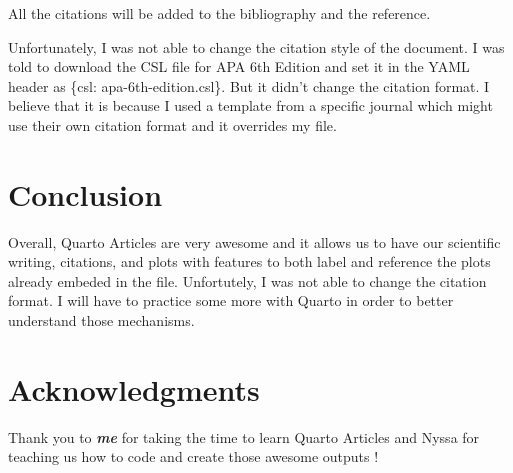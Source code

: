 \documentclass[
  10pt,
  letterpaper,
]{article}
\begin{document}
All the citations will be added to the bibliography and the reference.

Unfortunately, I was not able to change the citation style of the
document. I was told to download the CSL file for APA 6th Edition and
set it in the YAML header as \{csl: apa-6th-edition.csl\}. But it didn't
change the citation format. I believe that it is because I used a
template from a specific journal which might use their own citation
format and it overrides my file.

\section{Conclusion}\label{conclusion}

Overall, Quarto Articles are very awesome and it allows us to have our
scientific writing, citations, and plots with features to both label and
reference the plots already embeded in the file. Unfortutely, I was not
able to change the citation format. I will have to practice some more
with Quarto in order to better understand those mechanisms.

\section{Acknowledgments}\label{acknowledgments}

Thank you to \textbf{\emph{me}} for taking the time to learn Quarto
Articles and Nyssa for teaching us how to code and create those awesome
outputs !


\nolinenumbers
\renewcommand\refname{References}
  
\end{document}
